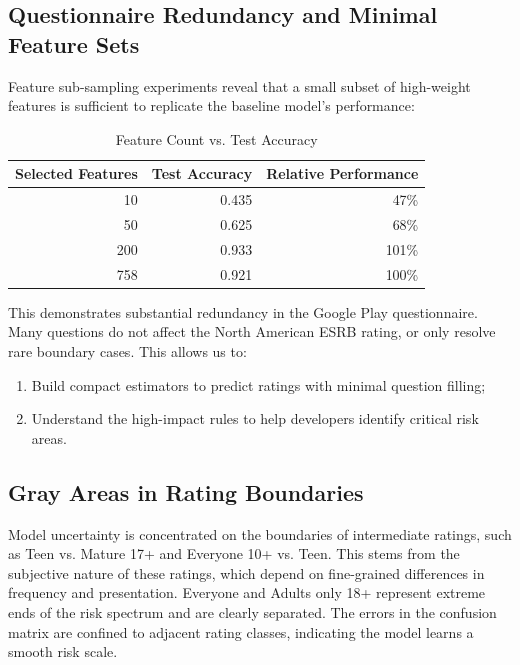 \documentclass[11pt,a4paper]{article}
\begin{document}
\subsection{Questionnaire Redundancy and Minimal Feature Sets}

Feature sub-sampling experiments reveal that a small subset of high-weight features is sufficient to replicate the baseline model's performance:

\begin{table}[H]
\centering
\caption{Feature Count vs. Test Accuracy}
\label{tab:feature-redundancy}
\renewcommand{\arraystretch}{1.25}
\begin{tabular}{rrr}
\toprule
Selected Features & Test Accuracy & Relative Performance \\
\midrule
10 & 0.435 & 47\% \\
50 & 0.625 & 68\% \\
200 & 0.933 & 101\% \\
758 & 0.921 & 100\% \\
\bottomrule
\end{tabular}
\end{table}

This demonstrates substantial redundancy in the Google Play questionnaire. Many questions do not affect the North American ESRB rating, or only resolve rare boundary cases. This allows us to:
\begin{enumerate}[leftmargin=2em]
  \item Build compact estimators to predict ratings with minimal question filling;
  \item Understand the high-impact rules to help developers identify critical risk areas.
\end{enumerate}

\subsection{Gray Areas in Rating Boundaries}

Model uncertainty is concentrated on the boundaries of intermediate ratings, such as Teen vs. Mature 17+ and Everyone 10+ vs. Teen. This stems from the subjective nature of these ratings, which depend on fine-grained differences in frequency and presentation. Everyone and Adults only 18+ represent extreme ends of the risk spectrum and are clearly separated. The errors in the confusion matrix are confined to adjacent rating classes, indicating the model learns a smooth risk scale.
\end{document}
